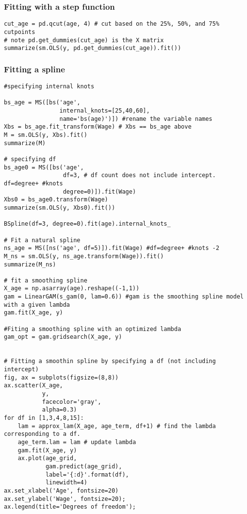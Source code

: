 \documentclass[
  letterpaper,
  DIV=11,
  numbers=noendperiod]{scrreprt}
\begin{document}
\subsubsection{Fitting with a step
function}\label{fitting-with-a-step-function}

\begin{verbatim}
cut_age = pd.qcut(age, 4) # cut based on the 25%, 50%, and 75% cutpoints
# note pd.get_dummies(cut_age) is the X matrix
summarize(sm.OLS(y, pd.get_dummies(cut_age)).fit()) 
\end{verbatim}

\subsubsection{Fitting a spline}\label{fitting-a-spline}

\begin{verbatim}
#specifying internal knots

bs_age = MS([bs('age',
                internal_knots=[25,40,60],
                name='bs(age)')]) #rename the variable names 
Xbs = bs_age.fit_transform(Wage) # Xbs == bs_age above
M = sm.OLS(y, Xbs).fit()
summarize(M)

# specifying df 
bs_age0 = MS([bs('age',
                 df=3, # df count does not include intercept. df=degree+ #knots
                 degree=0)]).fit(Wage)
Xbs0 = bs_age0.transform(Wage)
summarize(sm.OLS(y, Xbs0).fit())

BSpline(df=3, degree=0).fit(age).internal_knots_

# Fit a natural spline
ns_age = MS([ns('age', df=5)]).fit(Wage) #df=degree+ #knots -2
M_ns = sm.OLS(y, ns_age.transform(Wage)).fit()
summarize(M_ns)

# fit a smoothing spline
X_age = np.asarray(age).reshape((-1,1))
gam = LinearGAM(s_gam(0, lam=0.6)) #gam is the smoothing spline model with a given lambda
gam.fit(X_age, y)

#Fiting a smoothing spline with an optimized lambda
gam_opt = gam.gridsearch(X_age, y)


# Fitting a smoothin spline by specifying a df (not including intercept)
fig, ax = subplots(figsize=(8,8))
ax.scatter(X_age,
           y,
           facecolor='gray',
           alpha=0.3)
for df in [1,3,4,8,15]:
    lam = approx_lam(X_age, age_term, df+1) # find the lambda corresponding to a df. 
    age_term.lam = lam # update lambda
    gam.fit(X_age, y)
    ax.plot(age_grid,
            gam.predict(age_grid),
            label='{:d}'.format(df),
            linewidth=4)
ax.set_xlabel('Age', fontsize=20)
ax.set_ylabel('Wage', fontsize=20);
ax.legend(title='Degrees of freedom');



\end{verbatim}
\end{document}
